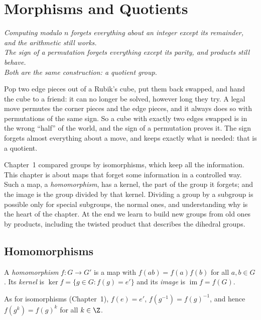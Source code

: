 \chapter{Morphisms and Quotients}

\begin{center}\itshape
Computing modulo $n$ forgets everything about an integer except its remainder, and the arithmetic still works.\\
The sign of a permutation forgets everything except its parity, and products still behave.\\
Both are the same construction: a quotient group.
\end{center}

Pop two edge pieces out of a Rubik's cube, put them back swapped, and hand the cube to a friend: it can no longer be solved, however long they
try. A legal move permutes the corner pieces and the edge pieces, and it always does so with permutations of the same sign. So a cube with
exactly two edges swapped is in the wrong ``half'' of the world, and the sign of a permutation proves it. The sign forgets almost everything about a
move, and keeps exactly what is needed: that is a quotient.

Chapter~1 compared groups by isomorphisms, which keep all the information. This chapter is about maps that forget some information in a controlled way. Such a map, a \emph{homomorphism}, has a kernel, the part of the group it forgets; and the image is the group divided by that kernel. Dividing a group by a subgroup is possible only for special subgroups, the normal ones, and understanding why is the heart of the chapter. At the end we learn to build new groups from old ones by products, including the twisted product that describes the dihedral groups.

\section{Homomorphisms}

\begin{definition}
A \emph{homomorphism} $f:G\to G'$ is a map with $f(ab)=f(a)f(b)$ for all $a,b\in G$. Its \emph{kernel} is $\ker f=\{g\in G:f(g)=e'\}$ and its \emph{image} is $\operatorname{im}f=f(G)$.
\end{definition}

As for isomorphisms (Chapter~1), $f(e)=e'$, $f(g^{-1})=f(g)^{-1}$, and hence $f(g^k)=f(g)^k$ for all $k\in\Z$.

